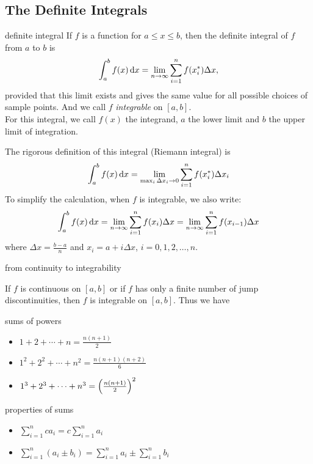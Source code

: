 \documentclass[Calculus 1 Recitation.tex]{subfiles}
\begin{document}
\subsection{The Definite Integrals}
\begin{myleftlinebox}
	definite integral
	\tcblower
	If $f$ is a function for $a\leq x\leq b$, then the definite integral of $f$ from $a$ to $b$ is
	\[\int_a^b f(x)\,\mathrm{d} x = \lim_{n\to\infty} \sum_{i=1}^n f(x_i^*)\Delta x,\]
	provided that this limit exists and gives the same value for all possible choices of sample points. And we call $f$ \emph{integrable} on $[a,b]$.\\
	For this integral, we call $f(x)$ the integrand, $a$ the lower limit and $b$ the upper limit of integration. 
	\begin{remark}
		The rigorous definition of this integral (Riemann integral) is 
		\[\int_a^b f(x)\,\mathrm{d} x = \lim_{\max_i \Delta x_i\to 0} \sum_{i=1}^n f(x_i^*)\Delta x_i\]
		To simplify the calculation, when $f$ is integrable, we also write:
		\[\int_a^b f(x)\,\mathrm{d} x =\lim_{n\to\infty} \sum_{i=1}^n f(x_i)\Delta x =\lim_{n\to\infty} \sum_{i=1}^n f(x_{i-1})\Delta x \]
		where $\Delta x=\frac{b-a}{n}$ and $x_i=a+i\Delta x$, $i=0,1,2,\dots,n$.
	\end{remark}
\end{myleftlinebox}

\begin{myleftlinebox}
	from continuity to integrability
	\tcblower
	\begin{theorem}
		If $f$ is continuous on $[a,b]$ or if $f$ has only a finite number of jump discontinuities, then $f$ is integrable on $[a,b]$. Thus we have
	\end{theorem}
\end{myleftlinebox}

\begin{myleftlinebox}
	sums of powers
	\tcblower
	\begin{itemize}
		\item $1+2+\cdots+n=\frac{n(n+1)}{2}$
		\item $1^2+2^2+\cdots+n^2 = \frac{n(n+1)(n+2)}{6}$
		\item $1^3+2^3+\cdots+n^3 = \left( \frac{n(n+1)}{2} \right)^2$
	\end{itemize}
\end{myleftlinebox}

\begin{myleftlinebox}
	properties of sums
	\tcblower
	\begin{itemize}
		\item $\sum_{i=1}^n c a_i=c\sum_{i=1}^n  a_i$
		\item $\sum_{i=1}^n (a_i\pm b_i) = \sum_{i=1}^n a_i \pm \sum_{i=1}^n b_i$
	\end{itemize}
\end{myleftlinebox}
\end{document}
